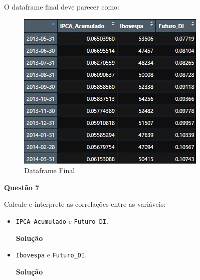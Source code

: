 \documentclass[12pt, a4paper]{article}
\begin{document}
O dataframe final deve parecer como:

\begin{figure}[H]
	\caption{Dataframe Final}
	\centering
	\includegraphics[scale=.63]{images/df.jpg}
\end{figure}



\textbf{Questão 7}

Calcule e interprete as correlações entre as variáveis:

\begin{itemize}
	\item \texttt{IPCA\_Acumulado} e \texttt{Futuro\_DI}.
	
	
	
	\textbf{Solução}
	
	
	
	
	
	\item \texttt{Ibovespa} e \texttt{Futuro\_DI}.
	
	
	
	\textbf{Solução}
	
	
	
	
	
\end{itemize}


	
\end{document}
